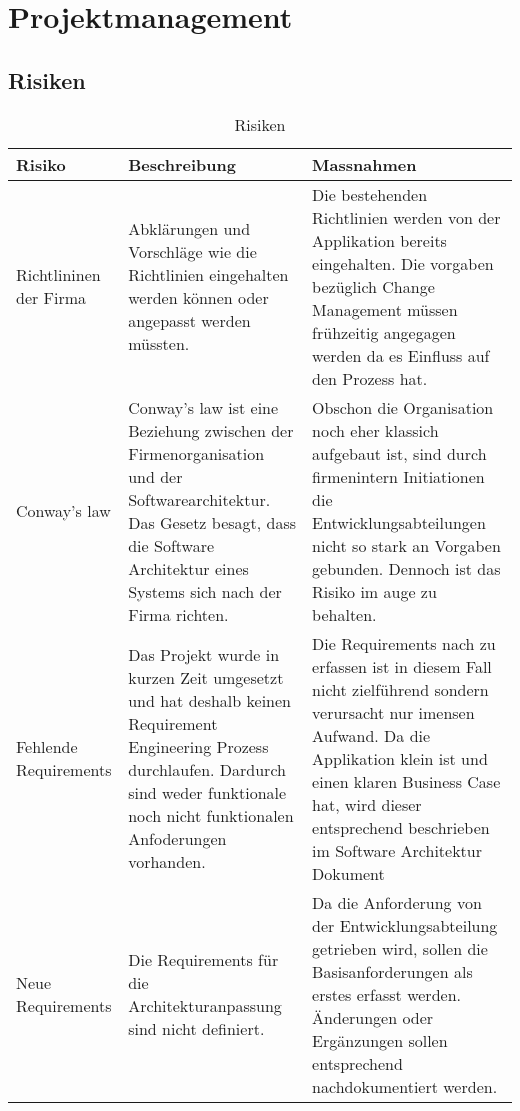 \chapter{Projektmanagement}

\begin{landscape}
\thispagestyle{empty}

\section{Risiken}
	\begin{table}[h!]
		\centering
		\caption{Risiken}
		\label{tab:table1}
		\begin{tabular}{ | p{2cm} | p{10cm} | p{10cm} | }
			\toprule
			{\textbf{Risiko}} & {\textbf{Beschreibung}} & {\textbf{Massnahmen}} \\
			\midrule
			Richtlininen der Firma & Abklärungen und Vorschläge wie die Richtlinien eingehalten werden können oder angepasst werden müssten. & Die bestehenden Richtlinien werden von der Applikation bereits eingehalten. Die vorgaben bezüglich Change Management müssen frühzeitig angegagen werden da es Einfluss auf den Prozess hat. \\ \hline
			Conway's law & Conway's law ist eine Beziehung zwischen der Firmenorganisation und der Softwarearchitektur. Das Gesetz besagt, dass die Software Architektur eines Systems sich nach der Firma richten. & Obschon die Organisation noch eher klassich aufgebaut ist, sind durch firmenintern Initiationen die Entwicklungsabteilungen nicht so stark an Vorgaben gebunden. Dennoch ist das Risiko im auge zu behalten. \\ \hline
			Fehlende Requirements & Das Projekt wurde in kurzen Zeit umgesetzt und hat deshalb keinen Requirement Engineering Prozess durchlaufen. Dardurch sind weder funktionale noch nicht funktionalen Anfoderungen vorhanden. & Die Requirements nach zu erfassen ist in diesem Fall nicht zielführend sondern verursacht nur imensen Aufwand. Da die Applikation klein ist und einen klaren Business Case hat,  wird dieser entsprechend beschrieben im Software Architektur Dokument\\ \hline
			Neue Requirements & Die Requirements für die Architekturanpassung sind nicht definiert. & Da die Anforderung von der Entwicklungsabteilung getrieben wird, sollen die Basisanforderungen als erstes erfasst werden. Änderungen oder Ergänzungen sollen entsprechend nachdokumentiert werden.\\ \hline
			\bottomrule
		\end{tabular}
	\end{table}
\vfill
\raisebox{0pt}{\makebox[\linewidth][r]{\thepage}}
\end{landscape}
\restoregeometry

